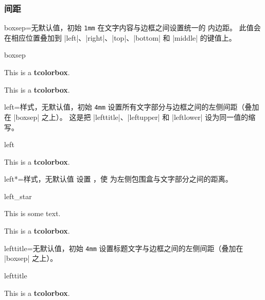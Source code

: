 \subsubsection{间距}
\begin{docTcbKey}{boxsep}{=}{无默认值，初始 \texttt{1mm}}
  在文字内容与边框之间设置统一的  内边距。
  此值会在相应位置叠加到 |left|、|right|、|top|、|bottom| 和 |middle|
  的键值上。
\begin{exdispExample}{boxsep}

\begin{tcolorbox}[boxsep=5mm]
This is a \textbf{tcolorbox}.
\end{tcolorbox}
\begin{tcolorbox}[boxsep=5mm,draft]
This is a \textbf{tcolorbox}.
\end{tcolorbox}
\end{exdispExample}
\end{docTcbKey}


\begin{docTcbKey}{left}{=}{样式，无默认值，初始 \texttt{4mm}}
  设置所有文字部分与边框之间的左侧间距（叠加在 |boxsep| 之上）。
  这是把 |lefttitle|、|leftupper| 和 |leftlower| 设为同一值的缩写。
\begin{exdispExample}{left}

\begin{tcolorbox}[left=0mm]
This is a \textbf{tcolorbox}.
\end{tcolorbox}
\end{exdispExample}
\end{docTcbKey}


\begin{docTcbKey}[][doc new=2017-02-16]{left*}{=}{样式，无默认值}
  设置 ，使  为左侧包围盒与文字部分之间的距离。
\begin{exdispExample}{left_star}

This is some text.
\begin{tcolorbox}[grow to left by=5mm,left*=0mm,
  enhanced,show bounding box]
This is a \textbf{tcolorbox}.
\end{tcolorbox}
\end{exdispExample}
\end{docTcbKey}

\clearpage
\begin{docTcbKey}{lefttitle}{=}{无默认值，初始 \texttt{4mm}}
  设置标题文字与边框之间的左侧间距（叠加在 |boxsep| 之上）。
\begin{exdispExample}{lefttitle}

\begin{tcolorbox}[lefttitle=3cm,title=My Title]
This is a \textbf{tcolorbox}.
\end{tcolorbox}
\end{exdispExample}
\end{docTcbKey}



